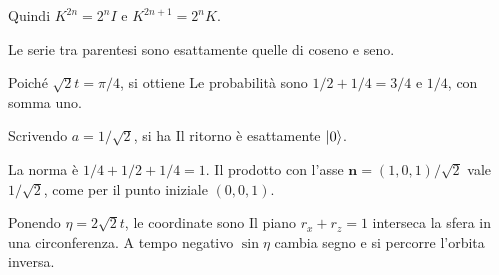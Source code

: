 \ExSolution


Quindi \(K^{2n}=2^nI\) e \(K^{2n+1}=2^nK\).


Le serie tra parentesi sono esattamente quelle di coseno e seno.


Poiché \(\sqrt2t=\pi/4\), si ottiene
Le probabilità sono \(1/2+1/4=3/4\) e \(1/4\), con somma uno.


Scrivendo \(a=1/\sqrt2\), si ha
Il ritorno è esattamente \(\lvert 0\rangle\).


La norma è \(1/4+1/2+1/4=1\). Il prodotto con l’asse \(\mathbf n=(1,0,1)/\sqrt2\) vale \(1/\sqrt2\), come per il punto iniziale \((0,0,1)\).


Ponendo \(\eta=2\sqrt2t\), le coordinate sono
Il piano \(r_x+r_z=1\) interseca la sfera in una circonferenza. A tempo negativo \(\sin\eta\) cambia segno e si percorre l’orbita inversa.


